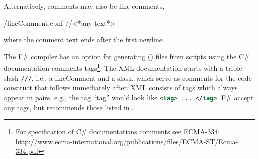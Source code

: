 \documentclass[fsharpNotes.tex]{subfiles}
\begin{document}
Alternatively, comments may also be line comments,
%
\begin{verbatimwrite}{\ebnf/lineComment.ebnf}
//<*any text*>
\end{verbatimwrite}
%
where the comment text ends after the first newline.

The F\# compiler has an option for generating  () files from scripts using the C\# documentation comments tags\footnote{For specification of C\# documentations comments see ECMA-334: \url{http://www.ecma-international.org/publications/files/ECMA-ST/Ecma-334.pdf}}. The XML documentation starts with a triple-slash \lstinline{///}, i.e., a lineComment and a slash, which serve as comments for the code construct that follows immediately after. XML consists of tags which always appear in pairs, e.g., the tag ``tag'' would look like \lstinline[language=xml]!<tag> ... </tag>!. F\# accept any tags, but recommends those listed in .
\end{document}

